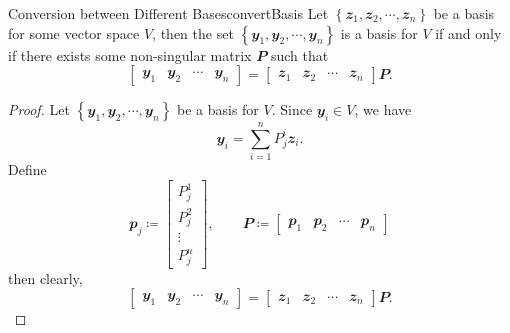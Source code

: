 \documentclass[math]{amznotes}
\theoremstyle{remark}
\begin{document}
\begin{probox}{Conversion between Different Bases}{convertBasis}
    Let $\left\{\mathbfit{z}_1, \mathbfit{z}_2, \cdots, \mathbfit{z}_n\right\}$ be a basis for some vector space $V$, then the set $\left\{\mathbfit{y}_1, \mathbfit{y}_2, \cdots, \mathbfit{y}_n\right\}$ is a basis for $V$ if and only if there exists some non-singular matrix $\mathbfit{P}$ such that 
    \begin{equation*}
        \begin{bmatrix}
            \mathbfit{y}_1 & \mathbfit{y}_2 & \cdots & \mathbfit{y}_n
        \end{bmatrix} = \begin{bmatrix}
            \mathbfit{z}_1 & \mathbfit{z}_2 & \cdots & \mathbfit{z}_n
        \end{bmatrix}\mathbfit{P}.
    \end{equation*}
    \tcblower
    \begin{proof}
        Let $\left\{\mathbfit{y}_1, \mathbfit{y}_2, \cdots, \mathbfit{y}_n\right\}$ be a basis for $V$. Since $\mathbfit{y}_i \in V$, we have 
        \begin{equation*}
            \mathbfit{y}_i = \sum_{i = 1}^{n}P^{i}_{j}\mathbfit{z}_i.
        \end{equation*}
        Define 
        \begin{equation*}
            \mathbfit{p}_j \coloneqq \begin{bmatrix}
                P^1_j \\
                P^2_j \\
                \vdots \\
                P^n_j
            \end{bmatrix}, \qquad \mathbfit{P} \coloneqq \begin{bmatrix}
                \mathbfit{p}_1 & \mathbfit{p}_2 & \cdots & \mathbfit{p}_n
            \end{bmatrix}
        \end{equation*}
        then clearly, 
        \begin{equation*}
            \begin{bmatrix}
                \mathbfit{y}_1 & \mathbfit{y}_2 & \cdots & \mathbfit{y}_n
            \end{bmatrix} = \begin{bmatrix}
                \mathbfit{z}_1 & \mathbfit{z}_2 & \cdots & \mathbfit{z}_n
            \end{bmatrix}\mathbfit{P}.

\end{equation*}
\end{proof}
\end{probox}
\end{document}
